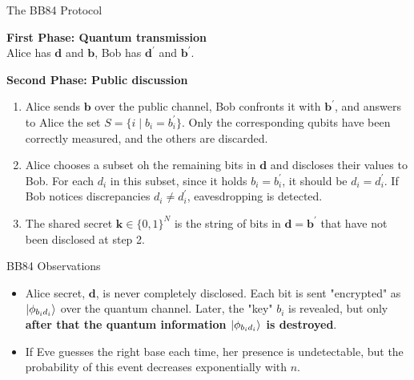 \documentclass{beamer}
\begin{document}
\begin{frame}{The BB84 Protocol}%

	\textbf{First Phase: Quantum transmission}\\
	\hspace{5pt} Alice has $\mathbf{d}$ and $\mathbf{b}$, Bob has $\mathbf{d}^\prime$ and $\mathbf{b}^\prime$.
	
	\textbf{Second Phase: Public discussion}
		\begin{enumerate}
		\item Alice sends $\mathbf{b}$ over the public channel, Bob confronts it with $\mathbf{b}^\prime$, and answers to Alice the set $S = \{i \mid b_i = b_i^\prime\}$. Only the corresponding qubits have been correctly measured, and the others are discarded.
		\pause\item Alice chooses a subset oh the remaining bits in $\mathbf{d}$ and discloses their values to Bob. For each $d_i$ in this subset, since it holds $b_i = b_i^\prime$, it should be $d_i = d_i^\prime$. If Bob notices discrepancies $d_i \neq d_i^\prime$, eavesdropping is detected.
		\pause\item The shared secret $\mathbf{k} \in \{0, 1\}^N$ is the string of bits in $\mathbf{d} = \mathbf{b}^\prime$ that have not been disclosed at step 2.
		\end{enumerate}	
\end{frame}

\begin{frame}{BB84 Observations}
\begin{itemize}
\item Alice secret, $\mathbf{d}$, is never completely disclosed. Each bit is sent "encrypted" as $\ket{\phi_{b_i d_i}}$ over the quantum channel. Later, the "key" $b_i$ is revealed, but only \textbf{after that the quantum information $\ket{\phi_{b_i d_i}}$ is destroyed}. 


\item If Eve guesses the right base each time, her presence is undetectable, but the probability of this event decreases exponentially with $n$.

\end{itemize}
\end{frame}
\end{document}
